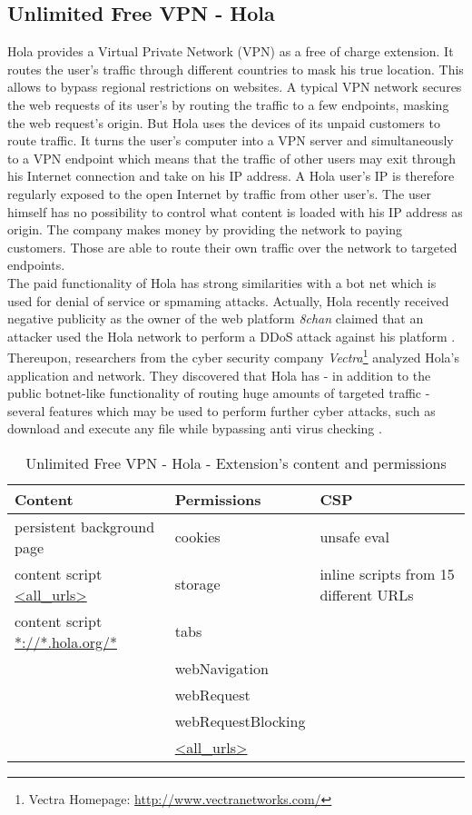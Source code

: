 \subsection{Unlimited Free VPN - Hola}
Hola provides a Virtual Private Network (VPN) as a free of charge extension. It routes the user's traffic through different countries to mask his true location. This allows to bypass regional restrictions on websites. A typical VPN network secures the web requests of its user's by routing the traffic to a few endpoints, masking the web request's origin. But Hola uses the devices of its unpaid customers to route traffic. It turns the user's computer into a VPN server and simultaneously to a VPN endpoint which means that the traffic of other users may exit through his Internet connection and take on his IP address. A Hola user's IP is therefore regularly exposed to the open Internet by traffic from other user's. The user himself has no possibility to control what content is loaded with his IP address as origin. The company makes money by providing the network to paying customers. Those are able to route their own traffic over the network to targeted endpoints. \\

The paid functionality of Hola has strong similarities with a bot net which is used for denial of service or spmaming attacks. Actually, Hola recently received negative publicity as the owner of the web platform \textit{8chan} claimed that an attacker used the Hola network to perform a DDoS attack against his platform \cite{8chanHola}. Thereupon, researchers from the cyber security company \textit{Vectra}\footnote{Vectra Homepage: \url{http://www.vectranetworks.com/}} analyzed Hola's application and network. They discovered that Hola has - in addition to the public botnet-like functionality of routing huge amounts of targeted traffic - several features which may be used to perform further cyber attacks, such as download and execute any file while bypassing anti virus checking \cite{vectraHola}. \\ 

\begin{table}[h]
	\centering
	\begin{tabular}{|l|l|l|} \hline
		\textbf{Content} & \textbf{Permissions} & \textbf{CSP} \\ \hline
		persistent background page & cookies & unsafe eval\\
		content script  \url{<all_urls>} & storage & inline scripts from 15 different URLs \\
		content script \url{*://*.hola.org/*} & tabs & \\ 
		& webNavigation & \\ 
		& webRequest & \\ 
		& webRequestBlocking & \\ 
		& \url{<all_urls>} & \\ \hline
	\end{tabular}
	\caption{Unlimited Free VPN - Hola - Extension's content and permissions}
\end{table}

